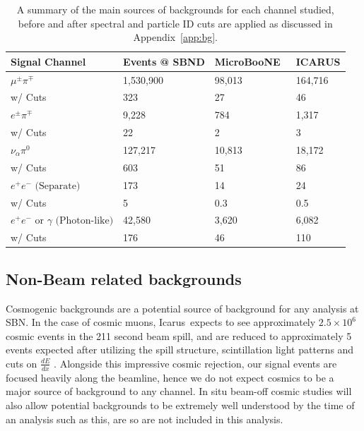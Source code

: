 \documentclass[11pt, a4paper]{article}
\newcommand{\refapp}[1]{Appendix~\ref{#1}}
\def\muboone{MicroBooNE}
\def\icarus{Icarus}
\begin{document}
\begin{table}[t]
\centering
\begin{tabular}{ l | l |  l | l |  }
	Signal Channel & Events @ SBND & \muboone\ & ICARUS \\
\hline\hline
$\mu^\pm \pi^\mp$ &  1,530,900  & 98,013 & 164,716\\
													  w/ Cuts &323 & 27 & 46 \\ \hline
$ e^\pm \pi^\mp$ &  9,228  & 784 & 1,317\\
													  w/ Cuts &22 & 2 & 3 \\ \hline
$ \nu_\alpha \pi^0$ &   127,217 & 10,813 & 18,172\\
													  w/ Cuts &603 & 51 & 86 \\ \hline
$ e^+e^- \text{ (Separate)} $ & 173 & 14 & 24\\
													  w/ Cuts &5 & 0.3 & 0.5\\ \hline
$ e^+ e^- \text{ or } \gamma \text{ (Photon-like)}$ &  42,580 & 3,620 & 6,082\\
													  w/ Cuts &176 & 46 & 110 \\ 
 \hline \hline

\end{tabular}

\caption{\label{tab:Rates} A summary of the main sources of backgrounds for
each channel studied, before and after spectral and particle ID cuts are
applied as discussed in \refapp{app:bg}. }

\end{table}


\subsection{Non-Beam related backgrounds}
Cosmogenic backgrounds are a potential source of background for any analysis at SBN. In the case of cosmic muons, \icarus\ expects to
see approximately $2.5 \times 10^{6}$ cosmic events in the 211 second beam
spill, and are reduced to approximately 5 events expected after utilizing the
spill structure, scintillation light patterns and cuts on $\frac{d E}{d x}$
\cite{Antonello:2015lea}.  Alongside this impressive cosmic rejection, our
signal events are focused heavily along the beamline, hence we do not expect
cosmics to be a major source of background to any channel. In situ beam-off
cosmic studies will also allow potential backgrounds to be extremely well
understood by the time of an analysis such as this, are so are not included in
this analysis. 
\end{document}
